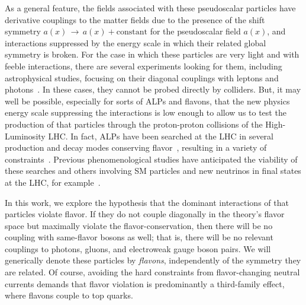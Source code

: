 \documentclass[prd,amsfonts,onecolumn,superscriptaddress,aps,nofootinbib,11pt]{revtex4-1}
\begin{document}
As a general feature, the fields associated with these pseudoscalar  particles  have derivative couplings to the matter fields due to the presence of the shift symmetry $a(x)\,\rightarrow\,a(x)+\mathrm{constant}$ for the pseudoscalar field $a(x)$, and interactions suppressed by the energy scale in which their related global symmetry is broken.   
For the case in which these particles are very light and with feeble interactions, there are several experiments looking for them, including  astrophysical studies,  focusing on their diagonal couplings with leptons and photons~\cite{Workman:2022ynf,DiLuzio:2020wdo}. In these cases, they cannot be probed directly by colliders. But, it may well be possible, especially for sorts of ALPs and flavons, that the new physics energy scale suppressing the interactions is low enough to allow us to test the production of that particles through the proton-proton collisions of the High-Luminosity LHC. In fact, ALPs have been searched at the LHC in several production and decay modes conserving flavor~\cite{dEnterria:2013zqi, CidVidal:2018blh, Goncalves:2021pdc,CMS:2018nsh, CMS:2019spf, ATLAS:2020ahi, CMS:2020ffa, ATLAS:2021hbr,ATLAS:2020pcy,dEnterria:2013zqi, CidVidal:2018blh, Goncalves:2021pdc,CMS:2018nsh, ATLAS:2020ahi, CMS:2020ffa, ATLAS:2021hbr,CMS:2020ffa,CMS:2018nsh, CMS:2019spf, ATLAS:2021hbr}, resulting in a variety of constraints~\cite{dEnterria:2021ljz}. Previous phenomenological studies have anticipated  the viability of these searches and others  involving SM particles and new neutrinos in final states at the LHC, for example~\cite{Mimasu:2014nea,Brivio:2017ije,Bauer:2018uxu,Bauer:2017ris,Bauer:2017nlg,Jaeckel:2015jla,Alves:2016koo,Alves:2019xpc,Gavela:2019cmq,Merlo:2019anv,Baldenegro:2019whq,Dobrich:2015jyk,Harland-Lang:2019zur,Dobrich:2019dxc,Hahn:1404985,Alekhin:2015byh,Feng:2018pew,Aloni:2019ruo,Alves:2021puo,Knapen:2021elo,Alonso-Alvarez:2023wni,Cheung:2023nzg}. 

In this work, we explore the hypothesis that the dominant interactions of that particles violate flavor. If they do not couple diagonally in the theory's flavor space but maximally violate the flavor-conservation, then there will be no coupling with same-flavor bosons as well; that is, there will be no relevant couplings to photons, gluons, and electroweak gauge boson pairs. We will generically denote these particles by {\it flavons}, independently of the symmetry they are related. Of course, avoiding the hard constraints from flavor-changing neutral currents demands that flavor violation is predominantly a third-family effect, where flavons couple to top quarks. 
\end{document}
